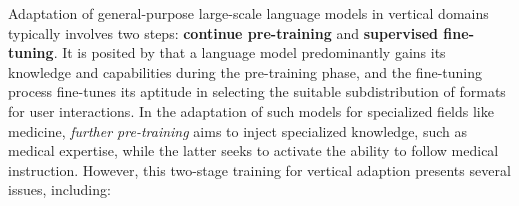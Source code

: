 \documentclass{article} %
\begin{document}
Adaptation of general-purpose large-scale language models in vertical domains typically involves two steps:\textbf{ continue pre-training} and \textbf{supervised fine-tuning}. It is posited  by \cite{zhou2023lima} that  a language model predominantly gains its knowledge and capabilities during the pre-training phase, and the fine-tuning process fine-tunes its aptitude in selecting the suitable subdistribution of formats for user interactions.
In the  adaptation of such models for specialized fields like medicine, \textit{further pre-training}  aims to inject specialized knowledge, such as medical expertise, while the latter seeks to activate the ability to follow medical instruction. 
However, this two-stage training for vertical adaption presents several issues, including:
\end{document}
